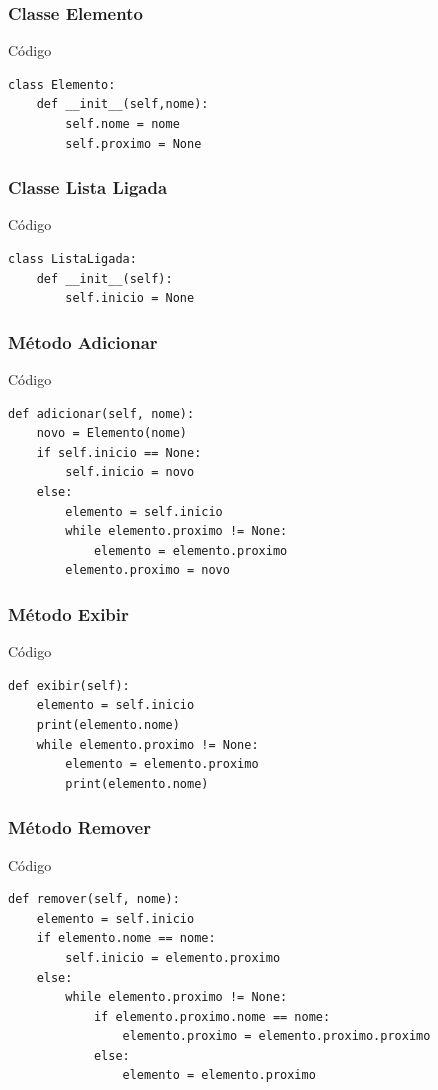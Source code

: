 \documentclass{beamer}
\begin{document}
\begin{frame}[fragile]
\frametitle{Classe Elemento}

\begin{exampleblock}{Código}
	\begin{lstlisting}
class Elemento:
    def __init__(self,nome):
        self.nome = nome
        self.proximo = None
	\end{lstlisting}
\end{exampleblock}
\end{frame}

\begin{frame}[fragile]
\frametitle{Classe Lista Ligada}

\begin{exampleblock}{Código}
	\begin{lstlisting}
class ListaLigada:
    def __init__(self):
        self.inicio = None
	\end{lstlisting}
\end{exampleblock}
\end{frame}

\begin{frame}[fragile]
\frametitle{Método Adicionar}

\begin{exampleblock}{Código}
	\begin{lstlisting}
def adicionar(self, nome):
    novo = Elemento(nome)
    if self.inicio == None:
        self.inicio = novo
    else:
        elemento = self.inicio
        while elemento.proximo != None:
            elemento = elemento.proximo
        elemento.proximo = novo
	\end{lstlisting}
\end{exampleblock}
\end{frame}

\begin{frame}[fragile]
\frametitle{Método Exibir}

\begin{exampleblock}{Código}
	\begin{lstlisting}
def exibir(self):
    elemento = self.inicio
    print(elemento.nome)
    while elemento.proximo != None:
        elemento = elemento.proximo
        print(elemento.nome)
	\end{lstlisting}
\end{exampleblock}
\end{frame}

\begin{frame}[fragile]
\frametitle{Método Remover}

\begin{exampleblock}{Código}

\begin{lstlisting}
def remover(self, nome):
    elemento = self.inicio
    if elemento.nome == nome:
        self.inicio = elemento.proximo
    else:
        while elemento.proximo != None:
            if elemento.proximo.nome == nome:
                elemento.proximo = elemento.proximo.proximo
            else:
                elemento = elemento.proximo
\end{lstlisting}

\end{exampleblock}
\end{frame}
\end{document}
